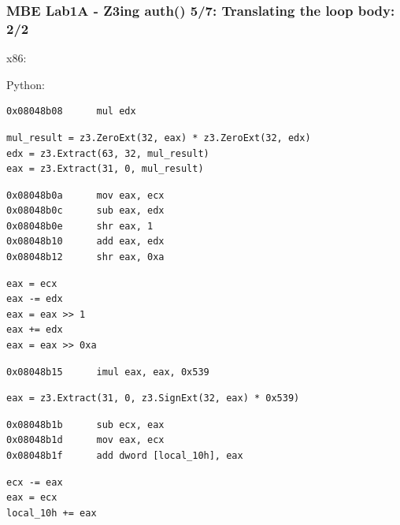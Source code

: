\documentclass[aspectratio=169]{beamer}
\begin{document}
\begin{frame}[fragile,t]
\frametitle{MBE Lab1A - Z3ing auth() 5/7: Translating the loop body: 2/2}
\begin{minipage}{0.5\textwidth}x86:\end{minipage}
\begin{minipage}{0.49\textwidth}Python:\end{minipage}

\begin{minipage}{0.3\textwidth}
\begin{Verbatim}[fontsize=\scriptsize, frame=single]
0x08048b08      mul edx
\end{Verbatim}
\end{minipage}
\begin{minipage}{0.69\textwidth}
\begin{Verbatim}[fontsize=\scriptsize, frame=single]
mul_result = z3.ZeroExt(32, eax) * z3.ZeroExt(32, edx)
edx = z3.Extract(63, 32, mul_result)
eax = z3.Extract(31, 0, mul_result)
\end{Verbatim}
\end{minipage}
\begin{minipage}{0.5\textwidth}
\begin{Verbatim}[fontsize=\scriptsize, frame=single]
0x08048b0a      mov eax, ecx
0x08048b0c      sub eax, edx
0x08048b0e      shr eax, 1
0x08048b10      add eax, edx
0x08048b12      shr eax, 0xa
\end{Verbatim}
\end{minipage}
\begin{minipage}{0.49\textwidth}
\begin{Verbatim}[fontsize=\scriptsize, frame=single]
eax = ecx
eax -= edx
eax = eax >> 1
eax += edx
eax = eax >> 0xa
\end{Verbatim}
\end{minipage}
\begin{minipage}{0.4\textwidth}
\begin{Verbatim}[fontsize=\scriptsize, frame=single]
0x08048b15      imul eax, eax, 0x539
\end{Verbatim}
\end{minipage}
\begin{minipage}{0.59\textwidth}
\begin{Verbatim}[fontsize=\scriptsize, frame=single]
eax = z3.Extract(31, 0, z3.SignExt(32, eax) * 0x539)
\end{Verbatim}
\end{minipage}
\begin{minipage}{0.5\textwidth}
\begin{Verbatim}[fontsize=\scriptsize, frame=single]
0x08048b1b      sub ecx, eax
0x08048b1d      mov eax, ecx
0x08048b1f      add dword [local_10h], eax
\end{Verbatim}
\end{minipage}
\begin{minipage}{0.49\textwidth}
\begin{Verbatim}[fontsize=\scriptsize, frame=single]
ecx -= eax
eax = ecx
local_10h += eax
\end{Verbatim}
\end{minipage}
\end{frame}
\end{document}
